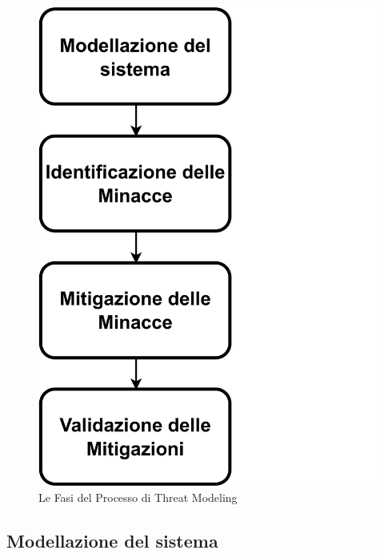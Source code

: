 \begin{figure}[!h]
    \centering
    \includegraphics[trim= 0cm 0cm 25.5cm 0cm, clip, width=0.15\linewidth]{img/the-4-step-framework-v2.drawio.pdf}
    \caption{Le Fasi del Processo di Threat Modeling}
    \label{fig:4-step-framework}
\end{figure}



\subsection{Modellazione del sistema}





